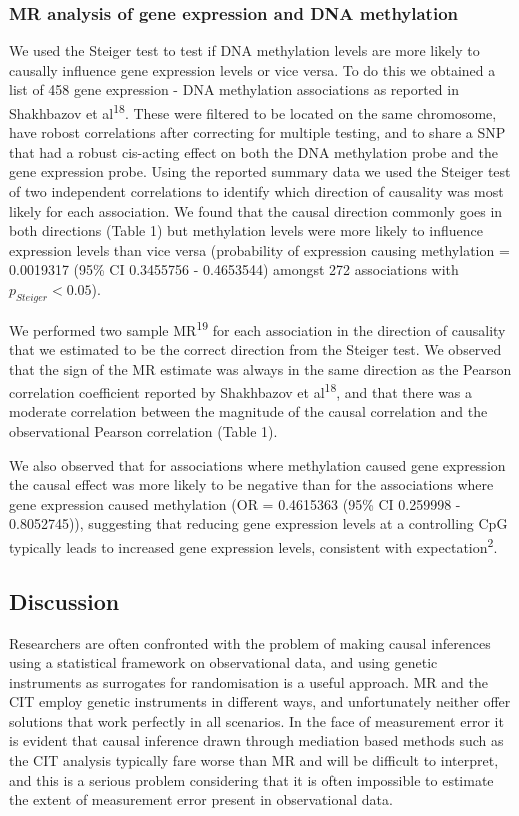 \documentclass[]{article}
\begin{document}
\subsubsection{MR analysis of gene expression and DNA
methylation}\label{mr-analysis-of-gene-expression-and-dna-methylation}

We used the Steiger test to test if DNA methylation levels are more
likely to causally influence gene expression levels or vice versa. To do
this we obtained a list of 458 gene expression - DNA methylation
associations as reported in Shakhbazov et al\textsuperscript{18}. These
were filtered to be located on the same chromosome, have robost
correlations after correcting for multiple testing, and to share a SNP
that had a robust cis-acting effect on both the DNA methylation probe
and the gene expression probe. Using the reported summary data we used
the Steiger test of two independent correlations to identify which
direction of causality was most likely for each association. We found
that the causal direction commonly goes in both directions (Table 1) but
methylation levels were more likely to influence expression levels than
vice versa (probability of expression causing methylation = 0.0019317
(95\% CI 0.3455756 - 0.4653544) amongst 272 associations with
\(p_{Steiger} < 0.05\)).

We performed two sample MR\textsuperscript{19} for each association in
the direction of causality that we estimated to be the correct direction
from the Steiger test. We observed that the sign of the MR estimate was
always in the same direction as the Pearson correlation coefficient
reported by Shakhbazov et al\textsuperscript{18}, and that there was a
moderate correlation between the magnitude of the causal correlation and
the observational Pearson correlation (Table 1).

We also observed that for associations where methylation caused gene
expression the causal effect was more likely to be negative than for the
associations where gene expression caused methylation (OR = 0.4615363
(95\% CI 0.259998 - 0.8052745)), suggesting that reducing gene
expression levels at a controlling CpG typically leads to increased gene
expression levels, consistent with expectation\textsuperscript{2}.

\subsection{Discussion}\label{discussion}

Researchers are often confronted with the problem of making causal
inferences using a statistical framework on observational data, and
using genetic instruments as surrogates for randomisation is a useful
approach. MR and the CIT employ genetic instruments in different ways,
and unfortunately neither offer solutions that work perfectly in all
scenarios. In the face of measurement error it is evident that causal
inference drawn through mediation based methods such as the CIT analysis
typically fare worse than MR and will be difficult to interpret, and
this is a serious problem considering that it is often impossible to
estimate the extent of measurement error present in observational data.
\end{document}
